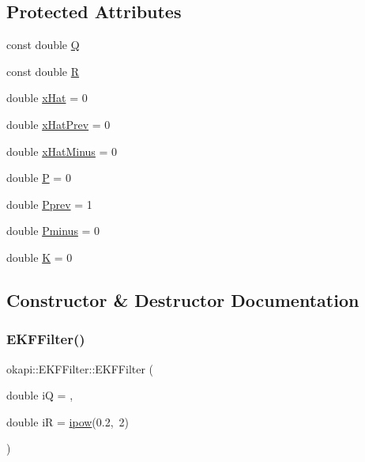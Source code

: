 \subsection*{Protected Attributes}
\begin{DoxyCompactItemize}
\item 
const double \mbox{\hyperlink{classokapi_1_1EKFFilter_adc164273e092ddd2644fed11299b3d23}{Q}}
\item 
const double \mbox{\hyperlink{classokapi_1_1EKFFilter_acadc8bcf0ad09e43e86634e4c02f18ab}{R}}
\item 
double \mbox{\hyperlink{classokapi_1_1EKFFilter_a6c8315a0d23c02f24cff68b1ac005f1c}{x\+Hat}} = 0
\item 
double \mbox{\hyperlink{classokapi_1_1EKFFilter_a849990196023b1386d56cae56ac3940b}{x\+Hat\+Prev}} = 0
\item 
double \mbox{\hyperlink{classokapi_1_1EKFFilter_a2be2e844f5465e0905b8d7e41e954461}{x\+Hat\+Minus}} = 0
\item 
double \mbox{\hyperlink{classokapi_1_1EKFFilter_acad3c08be69a1e49905a11c6e2e3050d}{P}} = 0
\item 
double \mbox{\hyperlink{classokapi_1_1EKFFilter_af3f5ecd50e9e04f0b449bd123c4ce41c}{Pprev}} = 1
\item 
double \mbox{\hyperlink{classokapi_1_1EKFFilter_a6ed132e10b9e4ed18c687af7709f4b7c}{Pminus}} = 0
\item 
double \mbox{\hyperlink{classokapi_1_1EKFFilter_ac6015f67f5730adc2950850b3a414930}{K}} = 0
\end{DoxyCompactItemize}


\subsection{Constructor \& Destructor Documentation}
\mbox{\label{classokapi_1_1EKFFilter_a99716eac24dd8f87e04f746da9409089}} 
\subsubsection{\texorpdfstring{EKFFilter()}{EKFFilter()}}
{\footnotesize\ttfamily okapi\+::\+E\+K\+F\+Filter\+::\+E\+K\+F\+Filter (\begin{DoxyParamCaption}\item[{double}]{iQ = {},  }\item[{double}]{iR = {\ttfamily \mbox{\hyperlink{namespaceokapi_aba6bd8fdde45445ead2bd8c3bf887fb4}{ipow}}(0.2,~2)} }\end{DoxyParamCaption})\hspace{0.3cm}{\ttfamily [explicit]}}

